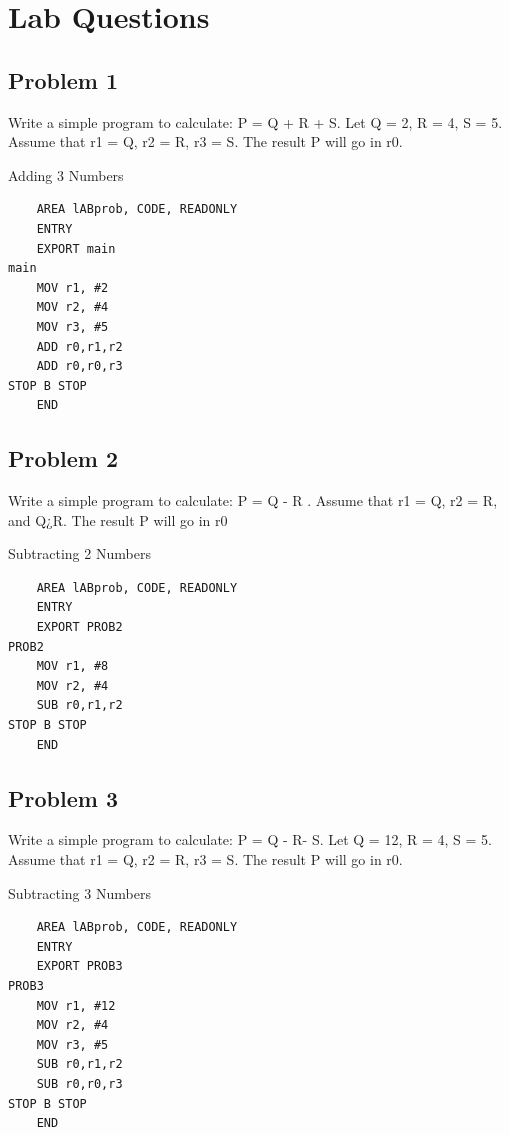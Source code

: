 \documentclass[11pt]{article}
\begin{document}
\section{Lab Questions}
\subsection{Problem 1}
Write a simple program to calculate: P = Q + R + S. Let Q = 2, R = 4, S = 5. Assume that r1
= Q, r2 = R, r3 = S. The result P will go in r0.

\begin{listing}[h]
    \caption{Adding 3 Numbers}
    \begin{verbatim}
    AREA lABprob, CODE, READONLY
    ENTRY
    EXPORT main
main 
	MOV r1, #2
	MOV r2, #4
	MOV r3, #5
	ADD r0,r1,r2
	ADD r0,r0,r3
STOP B STOP
    END
\end{verbatim}
\end{listing}


\subsection{Problem 2}
Write a simple program to calculate: P = Q - R . Assume that r1 = Q, r2 = R, and Q¿R. The
result P will go in r0

\begin{listing}[h]
    \caption{Subtracting 2 Numbers}
    \begin{verbatim}
    AREA lABprob, CODE, READONLY
    ENTRY
    EXPORT PROB2
PROB2
	MOV r1, #8
	MOV r2, #4
	SUB r0,r1,r2
STOP B STOP
    END
\end{verbatim}
\end{listing}

\subsection{Problem 3}
Write a simple program to calculate: P = Q - R- S. Let Q = 12, R = 4, S = 5. Assume that r1 =
Q, r2 = R, r3 = S. The result P will go in r0.

\begin{listing}[h]
    \caption{Subtracting 3 Numbers}
    \begin{verbatim}
    AREA lABprob, CODE, READONLY
    ENTRY
    EXPORT PROB3
PROB3
	MOV r1, #12
	MOV r2, #4
	MOV r3, #5
	SUB r0,r1,r2
	SUB r0,r0,r3
STOP B STOP
    END
\end{verbatim}
\end{listing}
\end{document}
